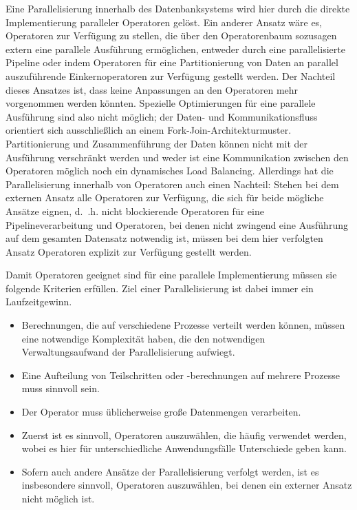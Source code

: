\documentclass[a4paper,12pt,twoside]{article}
\begin{document}
{Eine Parallelisierung innerhalb des Datenbanksystems wird hier durch die direkte Implementierung paralleler Operatoren gelöst. Ein anderer Ansatz wäre es, Operatoren zur Verfügung zu stellen, die über den Operatorenbaum sozusagen extern eine parallele Ausführung ermöglichen, entweder durch eine parallelisierte Pipeline oder indem Operatoren für eine Partitionierung von Daten an parallel auszuführende Einkernoperatoren zur Verfügung gestellt werden. Der Nachteil dieses Ansatzes ist, dass keine Anpassungen an den Operatoren mehr vorgenommen werden könnten. Spezielle Optimierungen für eine parallele Ausführung sind also nicht möglich; der Daten- und Kommunikationsfluss orientiert sich ausschließlich an einem Fork-Join-Architekturmuster. Partitionierung und Zusammenführung der Daten können nicht mit der Ausführung verschränkt werden und weder ist eine Kommunikation zwischen den Operatoren möglich noch ein dynamisches Load Balancing. Allerdings hat die Parallelisierung innerhalb von Operatoren auch einen Nachteil: Stehen bei dem externen Ansatz alle Operatoren zur Verfügung, die sich für beide mögliche Ansätze eignen, d.~.h. nicht blockierende Operatoren für eine Pipelineverarbeitung und Operatoren, bei denen nicht zwingend eine Ausführung auf dem gesamten Datensatz notwendig ist, müssen bei dem hier verfolgten Ansatz Operatoren explizit zur Verfügung gestellt werden.  

Damit Operatoren geeignet sind für eine parallele Implementierung müssen sie folgende Kriterien erfüllen. Ziel einer Parallelisierung ist dabei immer ein Laufzeitgewinn.

\begin{itemize}
	\item Berechnungen, die auf verschiedene Prozesse verteilt werden können, müssen eine notwendige Komplexität haben, die den notwendigen Verwaltungsaufwand der Parallelisierung aufwiegt.
	\item Eine Aufteilung von Teilschritten oder -berechnungen auf mehrere Prozesse muss sinnvoll sein.
	\item Der Operator muss üblicherweise große Datenmengen verarbeiten.
	\item Zuerst ist es sinnvoll, Operatoren auszuwählen, die häufig verwendet werden, wobei es hier für unterschiedliche Anwendungsfälle Unterschiede geben kann.
	\item Sofern auch andere Ansätze der Parallelisierung verfolgt werden, ist es insbesondere sinnvoll, Operatoren auszuwählen, bei denen ein externer Ansatz nicht möglich ist.
\end{itemize}

}
\end{document}
